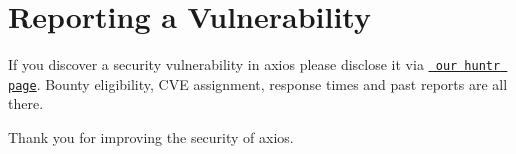 \chapter{Reporting a Vulnerability}
\hypertarget{md_pkiclassroomrescheduler_2src_2main_2frontend_2node__modules_2axios_2_s_e_c_u_r_i_t_y}{}\label{md_pkiclassroomrescheduler_2src_2main_2frontend_2node__modules_2axios_2_s_e_c_u_r_i_t_y}
\label{md_pkiclassroomrescheduler_2src_2main_2frontend_2node__modules_2axios_2_s_e_c_u_r_i_t_y_autotoc_md5632}%
%
 If you discover a security vulnerability in axios please disclose it via \href{https://huntr.dev/repos/axios/axios/}{\texttt{ our huntr page}}. Bounty eligibility, CVE assignment, response times and past reports are all there.

Thank you for improving the security of axios. 